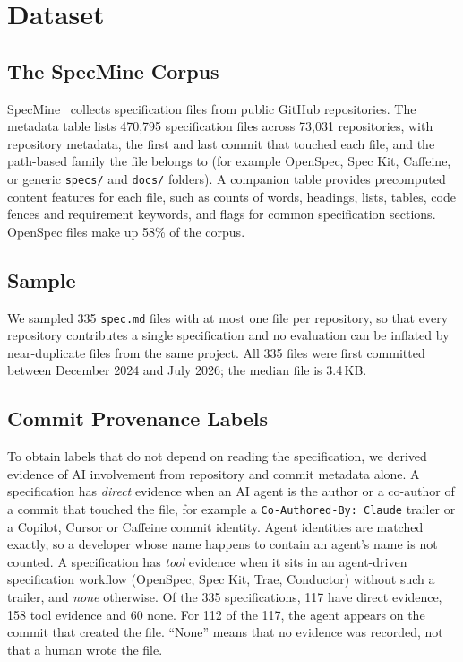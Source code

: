 \documentclass{article}
\begin{document}
\section{Dataset}
\subsection{The SpecMine Corpus}
SpecMine~\cite{specmine2026,specmine_hf} collects specification files from public GitHub repositories. The metadata table lists 470{,}795 specification files across 73{,}031 repositories, with repository metadata, the first and last commit that touched each file, and the path-based family the file belongs to (for example OpenSpec, Spec Kit, Caffeine, or generic \texttt{specs/} and \texttt{docs/} folders). A companion table provides precomputed content features for each file, such as counts of words, headings, lists, tables, code fences and requirement keywords, and flags for common specification sections. OpenSpec files make up 58\% of the corpus.

\subsection{Sample}
We sampled 335 \texttt{spec.md} files with at most one file per repository, so that every repository contributes a single specification and no evaluation can be inflated by near-duplicate files from the same project. All 335 files were first committed between December 2024 and July 2026; the median file is 3.4\,KB.

\subsection{Commit Provenance Labels}
\label{sec:provenance-labels}
To obtain labels that do not depend on reading the specification, we derived evidence of AI involvement from repository and commit metadata alone. A specification has \emph{direct} evidence when an AI agent is the author or a co-author of a commit that touched the file, for example a \texttt{Co-Authored-By: Claude} trailer or a Copilot, Cursor or Caffeine commit identity. Agent identities are matched exactly, so a developer whose name happens to contain an agent's name is not counted. A specification has \emph{tool} evidence when it sits in an agent-driven specification workflow (OpenSpec, Spec Kit, Trae, Conductor) without such a trailer, and \emph{none} otherwise. Of the 335 specifications, 117 have direct evidence, 158 tool evidence and 60 none. For 112 of the 117, the agent appears on the commit that created the file. ``None'' means that no evidence was recorded, not that a human wrote the file.
\end{document}

